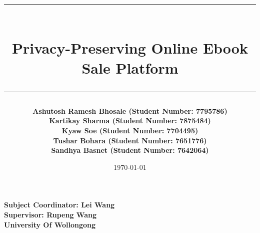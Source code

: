 \documentclass[12pt]{article}
\begin{document}
\title{
	\rule{\textwidth}{1pt} \\  %
	\vspace{0.4cm}
	Privacy-Preserving Online Ebook Sale Platform \\
	\vspace{0.4cm}
	\rule{\textwidth}{1pt}     %
}

\author{
	\textbf{Ashutosh Ramesh Bhosale (Student Number: 7795786)} \\[0.2cm]
	\textbf{Kartikay Sharma (Student Number: 7875484)} \\[0.2cm]
	\textbf{Kyaw Soe (Student Number: 7704495)} \\[0.2cm]
	\textbf{Tushar Bohara (Student Number: 7651776)} \\[0.2cm]
	\textbf{Sandhya Basnet (Student Number: 7642064)} \\
}

\date{\today}  %


	\maketitle
	
	\vfill
	\begin{center}
		\Large \textbf{Subject Coordinator: Lei Wang} \\[0.2cm]
		\Large \textbf{Supervisor: Rupeng Wang} \\[0.2cm]
		\Large \textbf{University Of Wollongong}  %
	\end{center}
\end{document}
